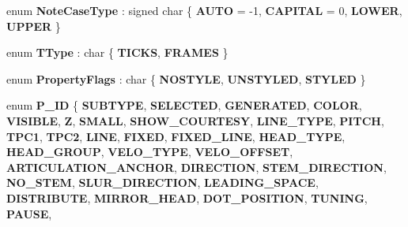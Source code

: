 \begin{DoxyCompactItemize}
\mbox{\label{namespace_ms_aa2148a30445aba3812a0d21a536952ef}} 
enum {\bfseries Note\+Case\+Type} \+: signed char \{ {\bfseries A\+U\+TO} = -\/1, 
{\bfseries C\+A\+P\+I\+T\+AL} = 0, 
{\bfseries L\+O\+W\+ER}, 
{\bfseries U\+P\+P\+ER}
 \}
\item 
\mbox{\label{namespace_ms_acf676791d3f11c09facc68ccaa9ebb1c}} 
enum {\bfseries T\+Type} \+: char \{ {\bfseries T\+I\+C\+KS}, 
{\bfseries F\+R\+A\+M\+ES}
 \}
\item 
\mbox{\label{namespace_ms_a56785a0f227cf3d1d0a4891656a35daa}} 
enum {\bfseries Property\+Flags} \+: char \{ {\bfseries N\+O\+S\+T\+Y\+LE}, 
{\bfseries U\+N\+S\+T\+Y\+L\+ED}, 
{\bfseries S\+T\+Y\+L\+ED}
 \}
\item 
\mbox{\label{namespace_ms_af537508ec551afde3c1a4a1184c8bd07}} 
enum {\bfseries P\+\_\+\+ID} \{ \newline
{\bfseries S\+U\+B\+T\+Y\+PE}, 
{\bfseries S\+E\+L\+E\+C\+T\+ED}, 
{\bfseries G\+E\+N\+E\+R\+A\+T\+ED}, 
{\bfseries C\+O\+L\+OR}, 
\newline
{\bfseries V\+I\+S\+I\+B\+LE}, 
{\bfseries Z}, 
{\bfseries S\+M\+A\+LL}, 
{\bfseries S\+H\+O\+W\+\_\+\+C\+O\+U\+R\+T\+E\+SY}, 
\newline
{\bfseries L\+I\+N\+E\+\_\+\+T\+Y\+PE}, 
{\bfseries P\+I\+T\+CH}, 
{\bfseries T\+P\+C1}, 
{\bfseries T\+P\+C2}, 
\newline
{\bfseries L\+I\+NE}, 
{\bfseries F\+I\+X\+ED}, 
{\bfseries F\+I\+X\+E\+D\+\_\+\+L\+I\+NE}, 
{\bfseries H\+E\+A\+D\+\_\+\+T\+Y\+PE}, 
\newline
{\bfseries H\+E\+A\+D\+\_\+\+G\+R\+O\+UP}, 
{\bfseries V\+E\+L\+O\+\_\+\+T\+Y\+PE}, 
{\bfseries V\+E\+L\+O\+\_\+\+O\+F\+F\+S\+ET}, 
{\bfseries A\+R\+T\+I\+C\+U\+L\+A\+T\+I\+O\+N\+\_\+\+A\+N\+C\+H\+OR}, 
\newline
{\bfseries D\+I\+R\+E\+C\+T\+I\+ON}, 
{\bfseries S\+T\+E\+M\+\_\+\+D\+I\+R\+E\+C\+T\+I\+ON}, 
{\bfseries N\+O\+\_\+\+S\+T\+EM}, 
{\bfseries S\+L\+U\+R\+\_\+\+D\+I\+R\+E\+C\+T\+I\+ON}, 
\newline
{\bfseries L\+E\+A\+D\+I\+N\+G\+\_\+\+S\+P\+A\+CE}, 
{\bfseries D\+I\+S\+T\+R\+I\+B\+U\+TE}, 
{\bfseries M\+I\+R\+R\+O\+R\+\_\+\+H\+E\+AD}, 
{\bfseries D\+O\+T\+\_\+\+P\+O\+S\+I\+T\+I\+ON}, 
\newline
{\bfseries T\+U\+N\+I\+NG}, 
{\bfseries P\+A\+U\+SE}, 

\end{DoxyCompactItemize}
